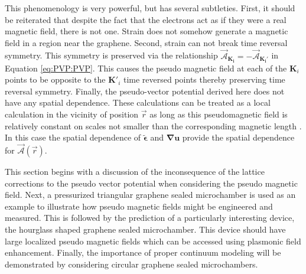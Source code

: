 This phenomenology is very powerful, but has several subtleties.
First, it should be reiterated that despite the fact that the electrons act as if they were a real magnetic field, there is not one.
Strain does not somehow generate a magnetic field in a region near the graphene.
Second, strain can not break time reversal symmetry.
This symmetry is preserved via the relationship $\vec{\mathcal{A}}_{\bm{K_i}} = - \vec{\mathcal{A}}_{\bm{K_i'}}$ in Equation \ref{eq:PVP:PVP}.
This causes the pseudo magnetic field at each of the $\bm{K}_i$ points to be opposite to the $\bm{K}'_i$ time reversed points thereby preserving time reversal symmetry.
Finally, the pseudo-vector potential derived here does not have any spatial dependence.
These calculations can be treated as a local calculation in the vicinity of position $\vec{r}$ as long as this pseudomagnetic field is relatively constant on scales not smaller than the corresponding magnetic length \cite{CastroNeto2009}.
In this case the spatial dependence of $\tilde{\bm{\epsilon}}$ and $\bm{\nabla u}$ provide the spatial dependence for $\vec{\mathcal{A}}(\vec{r})$.

This section begins with a discussion of the inconsequence of the lattice corrections to the pseudo vector potential when considering the pseudo magnetic field.
Next, a pressurized triangular graphene sealed microchamber \cite{Guinea2009} is used as an example to illustrate how pseudo magnetic fields might be engineered and measured.
This is followed by the prediction of a particularly interesting device, the hourglass shaped graphene sealed microchamber.
This device should have large localized pseudo magnetic fields which can be accessed using plasmonic field enhancement.
Finally, the importance of proper continuum modeling will be demonstrated by considering circular graphene sealed microchambers.


